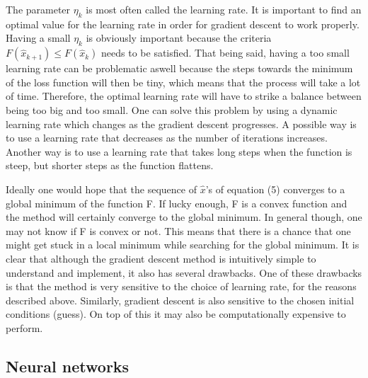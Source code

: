 \documentclass[a4paper,12pt]{article}
\begin{document}
The parameter $\eta_k$ is most often called the learning rate. It is important to find an optimal value for the learning rate in order for gradient descent to work properly. Having a small $\eta_k$ is obviously important because the criteria $F(\hat{x}_{k+1}) \leq F(\hat{x}_k)$ needs to be satisfied. That being said, having a too small learning rate can be problematic aswell because the steps towards the minimum of the loss function will then be tiny, which means that the process will take a lot of time. Therefore, the optimal learning rate will have to strike a balance between being too big and too small.\newline
One can solve this problem by using a dynamic learning rate which changes as the gradient descent progresses. A possible way is to use a learning rate that decreases as the number of iterations increases. Another way is to use a learning rate that takes long steps when the function is steep, but shorter steps as the function flattens.\newline


Ideally one would hope that the sequence of $\hat{x}$'s of equation (5) converges to a global minimum of the function F. If lucky enough, F is a convex function and the method will certainly converge to the global minimum.\newline 
In general though, one may not know if F is convex or not. This means that there is a chance that one might get stuck in a local minimum while searching for the global minimum. It is clear that although the gradient descent method is intuitively simple to understand and implement, it also has several drawbacks.\newline
One of these drawbacks is that the method is very sensitive to the choice of learning rate, for the reasons described above. Similarly, gradient descent is also sensitive to the chosen initial conditions (guess). On top of this it may also be computationally expensive to perform.

\subsection{Neural networks}
\end{document}
